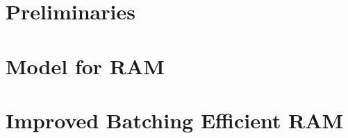 \documentclass[11pt]{article}
\begin{document}
    \section{Preliminaries}\label{sec:prelims}
%    

    \section{Model for RAM}\label{sec:model-for-ram}
    

    \section{Improved Batching Efficient RAM}\label{sec:batch-efficient-ram}
    




    
    
\end{document}
